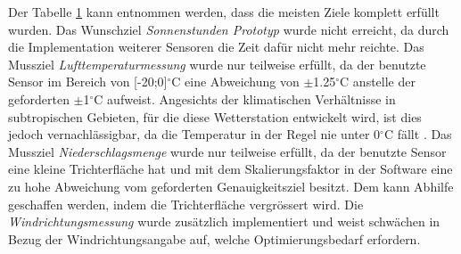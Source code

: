 \begin{landscape}
\begin{table}[htbp]
\begin{tabular}{l|l|l|l}
\bottomrule

    \end{tabular}%
  \label{tab:ZieleP5erreicht}%
\end{table}%

Der Tabelle \ref{tab:ZieleP5erreicht} kann entnommen werden, dass die meisten Ziele komplett erfüllt wurden. Das Wunschziel \textit{Sonnenstunden Prototyp} wurde nicht erreicht, da durch die Implementation weiterer Sensoren die Zeit dafür nicht mehr reichte. Das Mussziel \textit{Lufttemperaturmessung} wurde nur teilweise erfüllt, da der benutzte Sensor im Bereich von [-20;0]$^\circ$C eine Abweichung von $\pm$1.25$^\circ$C anstelle der geforderten $\pm$1$^\circ$C aufweist. Angesichts der klimatischen Verhältnisse in subtropischen Gebieten, für die diese Wetterstation entwickelt wird, ist dies jedoch vernachlässigbar, da die Temperatur in der Regel nie unter 0$^\circ$C fällt \cite{subtropklima}. Das Mussziel \textit{Niederschlagsmenge} wurde nur teilweise erfüllt, da der benutzte Sensor eine kleine Trichterfläche hat und mit dem Skalierungsfaktor in der Software eine zu hohe Abweichung vom geforderten Genauigkeitsziel besitzt. Dem kann Abhilfe geschaffen werden, indem die Trichterfläche vergrössert wird. Die \textit{Windrichtungsmessung} wurde zusätzlich implementiert und weist schwächen in Bezug der Windrichtungsangabe auf, welche Optimierungsbedarf erfordern. 
\end{landscape}